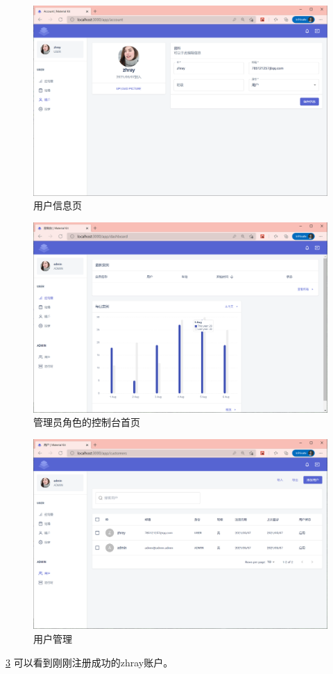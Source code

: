 \begin{figure}[htbp!]
    \centering
    \includegraphics[width=\textwidth]{figures/png/user_data.png}
    \caption{\label{user_data}用户信息页}
\end{figure}

\begin{figure}[htbp!]
    \centering
    \includegraphics[width=\textwidth]{figures/png/admin_ui.png}
    \caption{\label{admin_ui}管理员角色的控制台首页}
\end{figure}

\begin{figure}[htbp!]
    \centering
    \includegraphics[width=\textwidth]{figures/png/admin_users.png}
    \caption{\label{admin_users}用户管理}
\end{figure}
\ref{admin_users} 可以看到刚刚注册成功的zhray账户。

